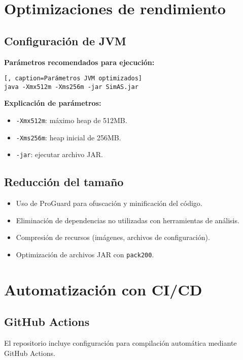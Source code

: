 \section{Optimizaciones de rendimiento}

\subsection{Configuración de JVM}

\textbf{Parámetros recomendados para ejecución:}
\begin{lstlisting}[, caption=Parámetros JVM optimizados]
java -Xmx512m -Xms256m -jar SimAS.jar
\end{lstlisting}

\textbf{Explicación de parámetros:}
\begin{itemize}
    \item \texttt{-Xmx512m}: máximo heap de 512MB.
    \item \texttt{-Xms256m}: heap inicial de 256MB.
    \item \texttt{-jar}: ejecutar archivo JAR.
\end{itemize}

\subsection{Reducción del tamaño}

\begin{itemize}
    \item Uso de ProGuard para ofuscación y minificación del código.
    \item Eliminación de dependencias no utilizadas con herramientas de análisis.
    \item Compresión de recursos (imágenes, archivos de configuración).
    \item Optimización de archivos JAR con \texttt{pack200}.
\end{itemize}

\section{Automatización con CI/CD}

\subsection{GitHub Actions}

El repositorio incluye configuración para compilación automática mediante GitHub Actions.

